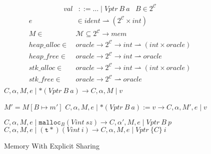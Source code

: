 \documentclass{article}
\begin{document}
\begin{figure}
    \[\begin{aligned}
    \mathit{val} & ::= \ldots \mid \mathit{Vptr} ~ B ~ a &
    B \in 2^{\mathcal{C}}
    \end{aligned}\]
    \[\begin{split}
    e & \in \mathit{ident} \rightharpoonup (2^{\mathcal{C}} \times \mathit{int}) \\
    M \in ~ & \mathcal{M} \subseteq 2^{\mathcal{C}} \rightarrow \mathit{mem} \\
    \mathit{heap\_alloc} \in ~ & \mathit{oracle} \rightarrow
    2^{\mathcal{C}} \rightarrow \mathit{int} \rightharpoonup
    (\mathit{int} \times \mathit{oracle}) \\
    \mathit{heap\_free} \in ~ & \mathit{oracle} \rightarrow 2^{\mathcal{C}} \rightarrow
    \mathit{int} \rightharpoonup \mathit{oracle} \\
    \mathit{stk\_alloc} \in ~ & \mathit{oracle} \rightarrow
    2^{\mathcal{C}} \rightarrow \mathit{int} \rightharpoonup
    (\mathit{int} \times \mathit{oracle}) \\
    \mathit{stk\_free} \in ~ & \mathit{oracle} \rightarrow 2^{\mathcal{C}}
    \rightharpoonup \mathit{oracle} \\
    \end{split}\]
             {\(C,\alpha,M,e \mid *(\mathit{Vptr} ~ B ~ a)
               \longrightarrow C, \alpha, M \mid v\)}

                {\(M' = M[B \mapsto m']\)}
                {\(C,\alpha,M,e \mid *(\mathit{Vptr} ~ B ~ a) := v
                  \longrightarrow C,\alpha,M',e \mid v\)}

             {\(C,\alpha,M,e \mid \mathtt{malloc}_B(\mathit{Vint} ~ sz)
               \longrightarrow C,\alpha',M,e \mid \mathit{Vptr} ~ B ~ p\)}
    \judgment{}
             {\(C,\alpha,M,e \mid \mathtt{(t*)} (\mathit{Vint} ~ i) \longrightarrow
               C,\alpha,M,e \mid \mathit{Vptr} ~ \{C\} ~ \mathit{i}\)}

  \caption{Memory With Explicit Sharing}
  \label{fig:powerset}
\end{figure}
\end{document}
